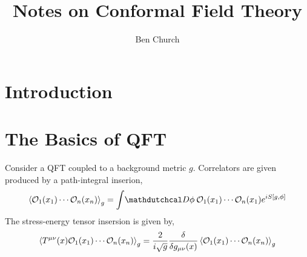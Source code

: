 \documentclass[12pt]{extarticle}
\begin{document}
\title{Notes on Conformal Field Theory}
\author{Ben Church}

\maketitle

\section{Introduction}

\section{The Basics of QFT}

\begin{theorem}
Consider a QFT coupled to a background metric $g$. Correlators are given produced by a path-integral inserion,
\[ \EV{\Op_1(x_1) \cdots \Op_n(x_n)}_g = \int \pathd{\phi} \Op_1(x_1) \cdots \Op_n(x_1) e^{i S[g, \phi]}  \]
The stress-energy tensor insersion is given by,
\[ \left< T^{\mu \nu}(x) \mathcal{O}_1(x_1) \cdots \mathcal{O}_n(x_n) \right>_g = \frac{2}{i \sqrt{g}} \frac{\delta}{\delta g_{\mu\nu}(x)} \left< \mathcal{O}_1(x_1) \cdots \mathcal{O}_n(x_n) \right>_g \]
\end{theorem}
\end{document}
